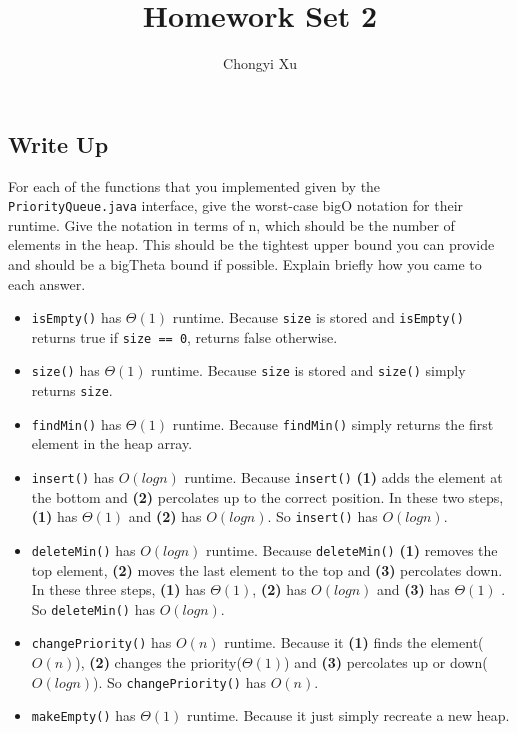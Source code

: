 \documentclass[]{exam}
\title{}
\title{Homework Set 2}
\author{Chongyi Xu}
\begin{document}
	
\maketitle
\begin{questions}
\section*{Write Up}
	\question For each of the functions that you implemented given by the \verb|PriorityQueue.java| interface, give the worst-case bigO notation for their runtime. Give the notation in terms of n, which should be the number of elements in the heap. This should be the tightest upper bound you can provide and should be a bigTheta bound if possible. Explain briefly how you came to each answer.
	\begin{itemize}
		\item \verb|isEmpty()| has $\Theta(1)$ runtime. Because \verb|size| is stored and \verb|isEmpty()| returns true if \verb|size == 0|, returns false otherwise.
		\item \verb|size()| has $\Theta(1)$ runtime. Because \verb|size| is stored and \verb|size()| simply returns \verb|size|.
		\item \verb|findMin()| has $\Theta(1)$ runtime. Because \verb|findMin()| simply returns the first element in the heap array.
		\item \verb|insert()| has $O(log n)$ runtime. Because \verb|insert()| \textbf{(1)} adds the element at the bottom and \textbf{(2)} percolates up to the correct position. In these two steps, \textbf{(1)} has $\Theta(1)$ and \textbf{(2)} has $O(log n)$. So \verb|insert()| has $O(log n)$.
		\item \verb|deleteMin()| has $O(log n)$ runtime. Because \verb|deleteMin()| \textbf{(1)} removes the top element, \textbf{(2)} moves the last element to the top and \textbf{(3)} percolates down. In these three steps, \textbf{(1)} has $\Theta(1)$, \textbf{(2)} has $O(log n)$ and \textbf{(3)} has $\Theta(1)$ . So \verb|deleteMin()| has $O(log n)$.
		\item \verb|changePriority()| has $O(n)$ runtime. Because it \textbf{(1)} finds the element($O(n)$), \textbf{(2)} changes the priority($\Theta(1)$) and \textbf{(3)} percolates up or down($O(log n)$). So \verb|changePriority()| has $O(n)$.
		\item \verb|makeEmpty()| has $\Theta(1)$ runtime. Because it just simply recreate a new heap.
	\end{itemize}


\end{questions}
\end{document}
